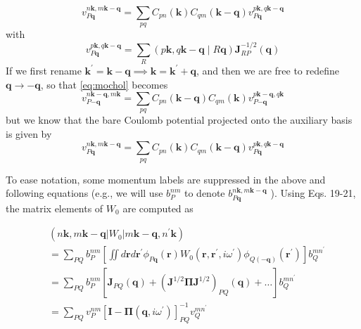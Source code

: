 \documentclass[12pt]{article}
\begin{document}
\begin{equation}
    v_{P\mathbf{q}}^{n \mathbf{k}, m \mathbf{k}-\mathbf{q}} = \sum_{pq} C_{pn}(\mathbf{k}) C_{qm}(\mathbf{k}-\mathbf{q}) v_{P\mathbf{q}}^{p\mathbf{k}, q\mathbf{k}-\mathbf{q}}
\label{eq:mochol}
\end{equation}
with
\begin{equation}
    v_{P\mathbf{q}}^{p\mathbf{k}, q\mathbf{k}-\mathbf{q}} = \sum_R (p\mathbf{k}, q\mathbf{k}-\mathbf{q} \mid R\mathbf{q}) \mathbf{J}_{RP}^{-1/2}(\mathbf{q})
\end{equation}
If we first rename $\mathbf{k^\prime} = \mathbf{k}-\mathbf{q} \implies \mathbf{k} = \mathbf{k^\prime} + \mathbf{q}$, and then we are free to redefine $\mathbf{q} \rightarrow -\mathbf{q}$, so that \ref{eq:mochol} becomes
\begin{equation}
    v_{P\mathbf{-q}}^{n \mathbf{k}-\mathbf{q}, m \mathbf{k}} = \sum_{pq} C_{pn}(\mathbf{k}-\mathbf{q}) C_{qm}(\mathbf{k}) v_{P\mathbf{-q}}^{p\mathbf{k}-\mathbf{q}, q\mathbf{k}}
\end{equation}
but we know that the bare Coulomb potential projected onto the auxiliary basis is given by
\begin{equation}
    v_{P\mathbf{q}}^{n\mathbf{k}, m\mathbf{k}-\mathbf{q}} = \sum_{pq} C_{pn}(\mathbf{k}) C_{qm}(\mathbf{k}-\mathbf{q}) v_{P\mathbf{q}}^{p\mathbf{k}, q\mathbf{k}-\mathbf{q}}
\end{equation}

To ease notation, some momentum labels are suppressed in the above and following equations (e.g., we will use $b_{P}^{n m}$ to denote $b_{P \mathbf{q}}^{n \mathbf{k}, m \mathbf{k}-\mathbf{q}}$ ). Using Eqs. 19-21, the matrix elements of $W_{0}$ are computed as

\begin{align*}
& \left(n \mathbf{k}, m \mathbf{k}-\mathbf{q}\left|W_{0}\right| m \mathbf{k}-\mathbf{q}, n^{\prime} \mathbf{k}\right) \\
& =\sum_{P Q} b_{P}^{n m}\left[\iint d \mathbf{r} d \mathbf{r}^{\prime} \phi_{P \mathbf{q}}(\mathbf{r}) W_{0}\left(\mathbf{r}, \mathbf{r}^{\prime}, i \omega^{\prime}\right) \phi_{Q(-\mathbf{q})}\left(\mathbf{r}^{\prime}\right)\right] b_{Q}^{m n^{\prime}} \\
& =\sum_{P Q} b_{P}^{n m}\left[\mathbf{J}_{P Q}(\mathbf{q})+\left(\mathbf{J}^{1 / 2} \boldsymbol{\Pi} \mathbf{J}^{1 / 2}\right)_{P Q}(\mathbf{q})+\ldots\right] b_{Q}^{m n^{\prime}}  \\
& =\sum_{P Q} v_{P}^{n m}\left[\mathbf{I}-\mathbf{\Pi}\left(\mathbf{q}, i \omega^{\prime}\right)\right]_{P Q}^{-1} v_{Q}^{m n^{\prime}}
\end{align*}
\end{document}
